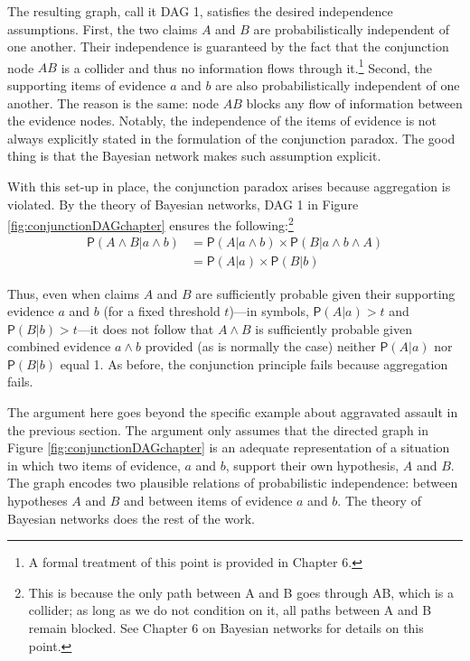 \documentclass[
  10pt,
  dvipsnames,enabledeprecatedfontcommands]{scrartcl}
\newcommand{\et}{\wedge}
\newcommand{\pr}[1]{\ensuremath{\mathsf{P}(#1)}}
\begin{document}
The resulting graph, call it \textsf{DAG 1}, satisfies the desired
independence assumptions. First, the two claims \(A\) and \(B\) are
probabilistically independent of one another. Their independence is
guaranteed by the fact that the conjunction node \(AB\) is a collider
and thus no information flows through it.\footnote{A formal treatment of
  this point is provided in Chapter 6.} Second, the supporting items of
evidence \(a\) and \(b\) are also probabilistically independent of one
another. The reason is the same: node \(AB\) blocks any flow of
information between the evidence nodes. Notably, the independence of the
items of evidence is not always explicitly stated in the formulation of
the conjunction paradox. The good thing is that the Bayesian network
makes such assumption explicit.

With this set-up in place, the conjunction paradox arises because
aggregation is violated. By the theory of Bayesian networks,
\textsf{DAG 1} in Figure \ref{fig:conjunctionDAGchapter} ensures the
following:\footnote{This is because the only path between \textsf{A} and
  \textsf{B} goes through \textsf{AB}, which is a collider; as long as
  we do not condition on it, all paths between \textsf{A} and \textsf{B}
  remain blocked. See Chapter 6 on Bayesian networks for details on this
  point.} \begin{align*}
\pr{A \wedge  B \vert a \wedge b}& =\pr{A \vert a \wedge b} \times \pr{B \vert  a \wedge b \wedge A}\\
 & = \pr{A \vert a} \times \pr{B \vert  b}
 \end{align*}

\noindent Thus, even when claims \(A\) and \(B\) are sufficiently
probable given their supporting evidence \(a\) and \(b\) (for a fixed
threshold \(t\))---in symbols, \(\pr{A \vert a}>t\) and
\(\pr{B \vert b}>t\)---it does not follow that \(A \et B\) is
sufficiently probable given combined evidence \(a\et b\) provided (as is
normally the case) neither \(\pr{A \vert a}\) nor \(\pr{B \vert b}\)
equal 1. As before, the conjunction principle fails because aggregation
fails.

The argument here goes beyond the specific example about aggravated
assault in the previous section. The argument only assumes that the
directed graph in Figure \ref{fig:conjunctionDAGchapter} is an adequate
representation of a situation in which two items of evidence, \(a\) and
\(b\), support their own hypothesis, \(A\) and \(B\). The graph encodes
two plausible relations of probabilistic independence: between
hypotheses \(A\) and \(B\) and between items of evidence \(a\) and
\(b\). The theory of Bayesian networks does the rest of the work.
\end{document}
